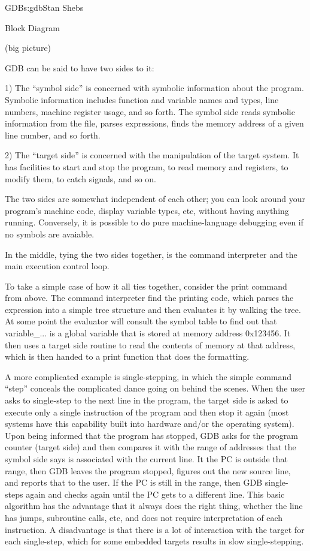 \begin{aosachapter}{GDB}{s:gdb}{Stan Shebs}
\begin{aosasect1}{Block Diagram}

(big picture)

GDB can be said to have two sides to it:

1) The ``symbol side'' is concerned with symbolic information about
the program.  Symbolic information includes function and variable
names and types, line numbers, machine register usage, and so forth.
The symbol side reads symbolic information from the file, parses
expressions, finds the memory address of a given line number, and so
forth.

2) The ``target side'' is concerned with the manipulation of the
target system.  It has facilities to start and stop the program, to
read memory and registers, to modify them, to catch signals, and so
on.

The two sides are somewhat independent of each other; you can look
around your program's machine code, display variable types, etc,
without having anything running.  Conversely, it is possible to do
pure machine-language debugging even if no symbols are avaiable.

In the middle, tying the two sides together, is the command interpreter
and the main execution control loop.

To take a simple case of how it all ties together, consider the
print command from above.  The command interpreter find the printing
code, which parses the expression into a simple tree structure and
then evaluates it by walking the tree.  At some point the evaluator
will consult the symbol table to find out that variable\_... is a global
variable that is stored at memory address 0x123456.  It then uses a
target side routine to read the contents of memory at that address,
which is then handed to a print function that does the formatting.

A more complicated example is single-stepping, in which the simple
command ``step'' conceals the complicated dance going on behind the
scenes.  When the user asks to single-step to the next line in the
program, the target side is asked to execute only a single instruction
of the program and then stop it again (most systems have this
capability built into hardware and/or the operating system).  Upon
being informed that the program has stopped, GDB asks for the program
counter (target side) and then compares it with the range of addresses
that the symbol side says is associated with the current line.  It the
PC is outside that range, then GDB leaves the program stopped, figures
out the new source line, and reports that to the user.  If the PC is
still in the range, then GDB single-steps again and checks again until
the PC gets to a different line.  This basic algorithm has the
advantage that it always does the right thing, whether the line has
jumps, subroutine calls, etc, and does not require interpretation of
each instruction.  A disadvantage is that there is a lot of interaction
with the target for each single-step, which for some embedded targets
results in slow single-stepping.


\end{aosasect1}
\end{aosachapter}
